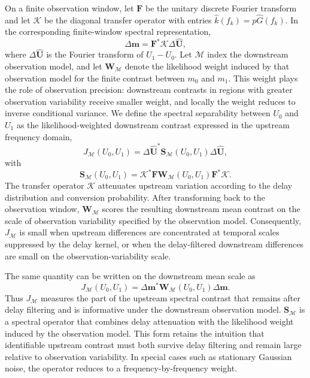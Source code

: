 On a finite observation window, let \(\mathbf F\) be the unitary discrete Fourier transform and let \(\mathcal K\) be the diagonal transfer operator with entries \(\widehat k(f_k)=p\widehat G(f_k)\). In the corresponding finite-window spectral representation,
\[
\Delta\mathbf m
=
\mathbf F^*
\mathcal K
\Delta\widehat{\mathbf U},
\]
where \(\Delta\widehat{\mathbf U}\) is the Fourier transform of \(U_1-U_0\). Let \(\mathcal M\) index the downstream observation model, and let \(\mathbf W_{\mathcal M}\) denote the likelihood weight induced by that observation model for the finite contrast between \(m_0\) and \(m_1\). This weight plays the role of observation precision: downstream contrasts in regions with greater observation variability receive smaller weight, and locally the weight reduces to inverse conditional variance. We define the spectral separability between \(U_0\) and \(U_1\) as the likelihood-weighted downstream contrast expressed in the upstream frequency domain,
\begin{equation}
J_{\mathcal M}(U_0,U_1)
=
\Delta\widehat{\mathbf U}^{*}
\mathbf S_{\mathcal M}(U_0,U_1)
\Delta\widehat{\mathbf U},
\label{eq:J-spectral}
\end{equation}
with
\begin{equation}
\mathbf S_{\mathcal M}(U_0,U_1)
=
\mathcal K^{*}
\mathbf F\mathbf W_{\mathcal M}(U_0,U_1)\mathbf F^{*}
\mathcal K.
\label{eq:S-operator}
\end{equation}
The transfer operator \(\mathcal K\) attenuates upstream variation according to the delay distribution and conversion probability. After transforming back to the observation window, \(\mathbf W_{\mathcal M}\) scores the resulting downstream mean contrast on the scale of observation variability specified by the observation model. Consequently, \(J_{\mathcal M}\) is small when upstream differences are concentrated at temporal scales suppressed by the delay kernel, or when the delay-filtered downstream differences are small on the observation-variability scale.

The same quantity can be written on the downstream mean scale as
\begin{equation}
J_{\mathcal M}(U_0,U_1)
=
\Delta\mathbf m^*
\mathbf W_{\mathcal M}(U_0,U_1)
\Delta\mathbf m .
\label{eq:J-time}
\end{equation}
Thus \(J_{\mathcal M}\) measures the part of the upstream spectral contrast that remains after delay filtering and is informative under the downstream observation model. \(\mathbf S_{\mathcal M}\) is a spectral operator that combines delay attenuation with the likelihood weight induced by the observation model. This form retains the intuition that identifiable upstream contrast must both survive delay filtering and remain large relative to observation variability. In special cases such as stationary Gaussian noise, the operator reduces to a frequency-by-frequency weight.

